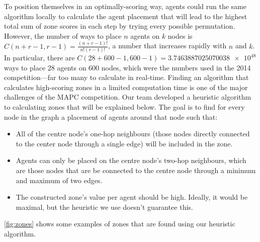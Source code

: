 To position themselves in an optimally-scoring way, agents could run the same algorithm locally to calculate the agent placement that will lead to the highest total sum of zone scores in each step by trying every possible permutation.
However, the number of ways to place $n$ agents on $k$ nodes is $C \left (n+r-1,r-1\right )= \frac{\left(n+r-1 \right )!}{n!\left(r-1 \right )!}$, a number that increases rapidly with $n$ and $k$.
In particular, there are $C \left (28+600-1,600-1 \right ) =\num{3.7463887025070038e+48}$ ways to place 28 agents on 600 nodes, which were the numbers used in the 2014 competition---far too many to calculate in real-time.
Finding an algorithm that calculates high-scoring zones in a limited computation time is one of the major challenges of the MAPC competition.
Our team developed a heuristic algorithm to calculating zones that will be explained below.
The goal is to find for every node in the graph a placement of agents around that node such that:
\begin{itemize}
  \item All of the centre node's one-hop neighbours (those nodes directly connected to the center node through a single edge) will be included in the zone.
  \item Agents can only be placed on the centre node's two-hop neighbours, which are those nodes that are be connected to the centre node through a minimum and maximum of two edges.
  \item The constructed zone's value per agent should be high.
        Ideally, it would be maximal, but the heuristic we use doesn't guarantee this.
\end{itemize}
\autoref{fig:zones} shows some examples of zones that are found using our heuristic algorithm.
